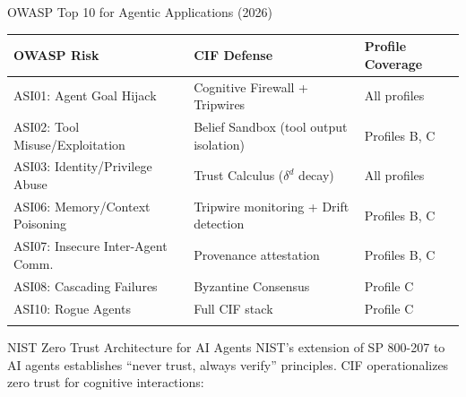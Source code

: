 \documentclass[
  ignorenonframetext,
]{beamer}
\newcounter{none} %
\begin{document}
\begin{frame}[allowframebreaks]{OWASP Top 10 for Agentic Applications
(2026)}
{\def\LTcaptype{none} %
\begin{longtable}[]{@{}
  >{\raggedright\arraybackslash}p{}
  >{\raggedright\arraybackslash}p{}
  >{\raggedright\arraybackslash}p{}@{}}
\toprule\noalign{}
\begin{minipage}[b]{\linewidth}\raggedright
OWASP Risk
\end{minipage} & \begin{minipage}[b]{\linewidth}\raggedright
CIF Defense
\end{minipage} & \begin{minipage}[b]{\linewidth}\raggedright
Profile Coverage
\end{minipage} \\
\midrule\noalign{}
\endhead
ASI01: Agent Goal Hijack & Cognitive Firewall + Tripwires & All
profiles \\
ASI02: Tool Misuse/Exploitation & Belief Sandbox (tool output isolation)
& Profiles B, C \\
ASI03: Identity/Privilege Abuse & Trust Calculus (\(\delta^d\) decay) &
All profiles \\
ASI06: Memory/Context Poisoning & Tripwire monitoring + Drift detection
& Profiles B, C \\
ASI07: Insecure Inter-Agent Comm. & Provenance attestation & Profiles B,
C \\
ASI08: Cascading Failures & Byzantine Consensus & Profile C \\
ASI10: Rogue Agents & Full CIF stack & Profile C \\
\bottomrule\noalign{}
\end{longtable}
}
\end{frame}

\begin{frame}[allowframebreaks]{NIST Zero Trust Architecture for AI
Agents}
\protect{}\label{nist-zero-trust-architecture-for-ai-agents}
NIST's extension of SP 800-207 to AI agents establishes ``never trust,
always verify'' principles. CIF operationalizes zero trust for cognitive
interactions:

\end{frame}
\end{document}
